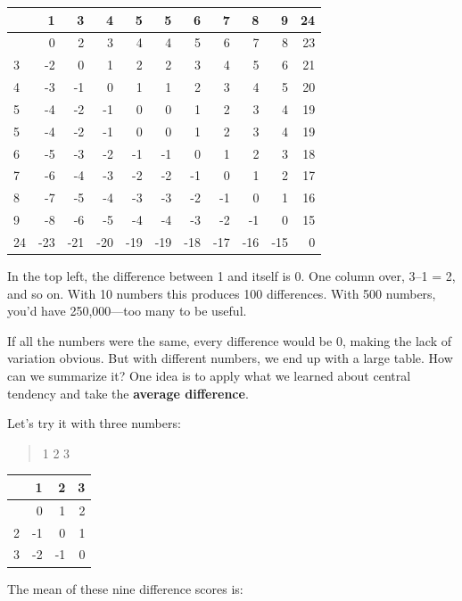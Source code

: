 \documentclass[
  letterpaper,
  DIV=11,
  numbers=noendperiod]{scrreprt}
\begin{document}
\begin{longtable}[]{@{}lrrrrrrrrrr@{}}
\toprule\noalign{}
& 1 & 3 & 4 & 5 & 5 & 6 & 7 & 8 & 9 & 24 \\
\midrule\noalign{}
\endhead
\bottomrule\noalign{}
\endlastfoot
1 & 0 & 2 & 3 & 4 & 4 & 5 & 6 & 7 & 8 & 23 \\
3 & -2 & 0 & 1 & 2 & 2 & 3 & 4 & 5 & 6 & 21 \\
4 & -3 & -1 & 0 & 1 & 1 & 2 & 3 & 4 & 5 & 20 \\
5 & -4 & -2 & -1 & 0 & 0 & 1 & 2 & 3 & 4 & 19 \\
5 & -4 & -2 & -1 & 0 & 0 & 1 & 2 & 3 & 4 & 19 \\
6 & -5 & -3 & -2 & -1 & -1 & 0 & 1 & 2 & 3 & 18 \\
7 & -6 & -4 & -3 & -2 & -2 & -1 & 0 & 1 & 2 & 17 \\
8 & -7 & -5 & -4 & -3 & -3 & -2 & -1 & 0 & 1 & 16 \\
9 & -8 & -6 & -5 & -4 & -4 & -3 & -2 & -1 & 0 & 15 \\
24 & -23 & -21 & -20 & -19 & -19 & -18 & -17 & -16 & -15 & 0 \\
\end{longtable}

In the top left, the difference between 1 and itself is 0. One column
over, 3--1 = 2, and so on. With 10 numbers this produces 100
differences. With 500 numbers, you'd have 250,000---too many to be
useful.

If all the numbers were the same, every difference would be 0, making
the lack of variation obvious. But with different numbers, we end up
with a large table. How can we summarize it? One idea is to apply what
we learned about central tendency and take the \textbf{average
difference}.

Let's try it with three numbers:

\begin{quote}
1 2 3
\end{quote}

\begin{longtable}[]{@{}lrrr@{}}
\toprule\noalign{}
& 1 & 2 & 3 \\
\midrule\noalign{}
\endhead
\bottomrule\noalign{}
\endlastfoot
1 & 0 & 1 & 2 \\
2 & -1 & 0 & 1 \\
3 & -2 & -1 & 0 \\
\end{longtable}

The mean of these nine difference scores is:
\end{document}
